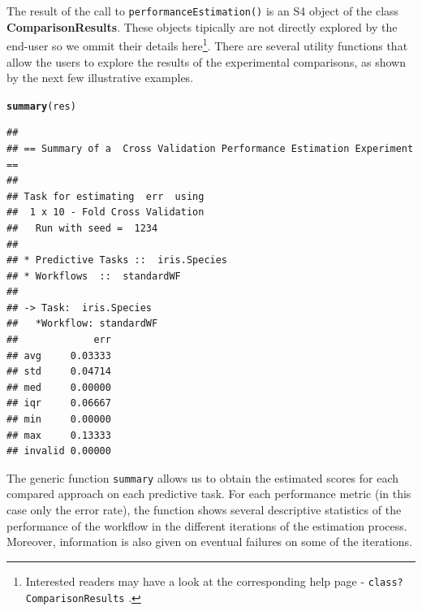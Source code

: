 \documentclass[10pt,a4paper]{article}\usepackage[]{graphicx}\usepackage[]{color}
\makeatletter
\newcommand{\hlstd}[1]{\textcolor[rgb]{0.345,0.345,0.345}{#1}}%
\newcommand{\hlkwd}[1]{\textcolor[rgb]{0.737,0.353,0.396}{\textbf{#1}}}%
\newenvironment{kframe}{%
 \def\at@end@of@kframe{}%
 \ifinner\ifhmode%
  \def\at@end@of@kframe{\end{minipage}}%
  \begin{minipage}{\columnwidth}%
 \fi\fi%
 \def\FrameCommand##1{\hskip\@totalleftmargin \hskip-\fboxsep
 \colorbox{shadecolor}{##1}\hskip-\fboxsep
     \hskip-\linewidth \hskip-\@totalleftmargin \hskip\columnwidth}%
 \MakeFramed {\advance\hsize-\width
   \@totalleftmargin\z@ \linewidth\hsize
   \@setminipage}}%
 {\par\unskip\endMakeFramed%
 \at@end@of@kframe}
\newenvironment{knitrout}{}{} %
\makeatother
\begin{document}

The result of the call to \texttt{performanceEstimation()} is an S4
object of the class \textbf{ComparisonResults}. These objects tipically are not
 directly explored by the end-user so we ommit their
details here\footnote{Interested readers may have a look at the corresponding
  help page - \texttt{class?ComparisonResults} .}. There are several utility
functions that allow the users to explore the results of the
experimental comparisons, as shown by the next few illustrative examples.




\begin{knitrout}\footnotesize
{}\color{fgcolor}\begin{kframe}
\begin{alltt}
\hlkwd{summary}\hlstd{(res)}
\end{alltt}
\begin{verbatim}
## 
## == Summary of a  Cross Validation Performance Estimation Experiment ==
## 
## Task for estimating  err  using
##  1 x 10 - Fold Cross Validation
## 	 Run with seed =  1234 
## 
## * Predictive Tasks ::  iris.Species
## * Workflows  ::  standardWF 
## 
## -> Task:  iris.Species
##   *Workflow: standardWF 
##             err
## avg     0.03333
## std     0.04714
## med     0.00000
## iqr     0.06667
## min     0.00000
## max     0.13333
## invalid 0.00000
\end{verbatim}
\end{kframe}
\end{knitrout}

The generic function \texttt{summary} allows us to obtain the
estimated scores for each compared approach on each predictive
task. For each performance metric (in this case only the error rate),
the function shows several descriptive statistics of the performance of the workflow in the different iterations of the estimation process. Moreover,
information is also given on eventual failures on some of the
iterations.
\end{document}
